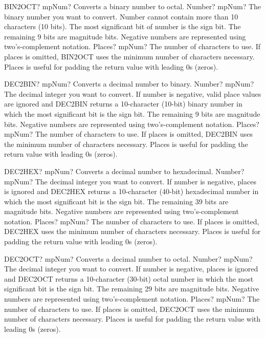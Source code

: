 \documentclass[12pt,a4paper,openany]{book}
\begin{document}
\begin{mpFunctionsExtract}
\mpWorksheetFunctionTwoNotImplemented
{BIN2OCT? mpNum? Converts a binary number to octal.}
{Number? mpNum? The binary number you want to convert. Number cannot contain more than 10 characters (10 bits). The most significant bit of number is the sign bit. The remaining 9 bits are magnitude bits. Negative numbers are represented using two's-complement notation.}
{Places? mpNum? The number of characters to use. If places is omitted, BIN2OCT uses the minimum number of characters necessary. Places is useful for padding the return value with leading 0s (zeros).}
\end{mpFunctionsExtract}

\begin{mpFunctionsExtract}
\mpWorksheetFunctionTwoNotImplemented
{DEC2BIN? mpNum? Converts a decimal number to binary.}
{Number? mpNum? The decimal integer you want to convert. If number is negative, valid place values are ignored and DEC2BIN returns a 10-character (10-bit) binary number in which the most significant bit is the sign bit. The remaining 9 bits are magnitude bits. Negative numbers are represented using two's-complement notation.}
{Places? mpNum? The number of characters to use. If places is omitted, DEC2BIN uses the minimum number of characters necessary. Places is useful for padding the return value with leading 0s (zeros).}
\end{mpFunctionsExtract}

\begin{mpFunctionsExtract}
\mpWorksheetFunctionTwoNotImplemented
{DEC2HEX? mpNum? Converts a decimal number to hexadecimal.}
{Number? mpNum? The decimal integer you want to convert. If number is negative, places is ignored and DEC2HEX returns a 10-character (40-bit) hexadecimal number in which the most significant bit is the sign bit. The remaining 39 bits are magnitude bits. Negative numbers are represented using two's-complement notation.}
{Places? mpNum? The number of characters to use. If places is omitted, DEC2HEX uses the minimum number of characters necessary. Places is useful for padding the return value with leading 0s (zeros).}
\end{mpFunctionsExtract}

\begin{mpFunctionsExtract}
\mpWorksheetFunctionTwoNotImplemented
{DEC2OCT? mpNum? Converts a decimal number to octal.}
{Number? mpNum? The decimal integer you want to convert. If number is negative, places is ignored and DEC2OCT returns a 10-character (30-bit) octal number in which the most significant bit is the sign bit. The remaining 29 bits are magnitude bits. Negative numbers are represented using two's-complement notation.}
{Places? mpNum? The number of characters to use. If places is omitted, DEC2OCT uses the minimum number of characters necessary. Places is useful for padding the return value with leading 0s (zeros).}
\end{mpFunctionsExtract}
\end{document}
